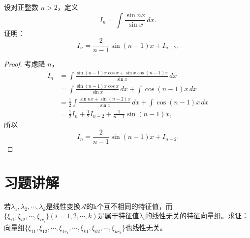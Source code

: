 \documentclass[lang=cn,12pt]{elegantbook}
\begin{document}
\begin{example}
    设对正整数 \( n > 2 \)，定义 
    \[
    I_n = \int \frac{\sin nx}{\sin x} \, dx.
    \]
    证明：
    \[
    I_n = \frac{2}{n-1} \sin(n-1)x + I_{n-2}.
    \]
    \end{example}
    
\begin{proof}
考虑降 \( n \)，
\[
\begin{aligned}
I_n &= \int \frac{\sin(n-1)x \cos x + \sin x \cos(n-1)x}{\sin x} \, dx \\
&= \int \frac{\sin(n-1)x \cos x}{\sin x} \, dx + \int \cos(n-1)x \, dx \\
&= \frac{1}{2} \int \frac{\sin nx + \sin(n-2)x}{\sin x} \, dx + \int \cos(n-1)x \, dx \\
&= \frac{1}{2} I_n + \frac{1}{2} I_{n-2} + \frac{1}{n-1} \sin(n-1)x,
\end{aligned}
\]
所以
\[
I_n = \frac{2}{n-1} \sin(n-1)x + I_{n-2}.
\]
\end{proof}

\section{习题讲解}

\begin{example}
    若$\lambda_1,\lambda_2,\cdots,\lambda_k$是线性变换$\mathcal{A}$的k个互不相同的特征值，而$\{\xi_{i1},\xi_{i2},\cdots,\xi_{ir_i}\} (i = 1 ,2,\cdots,k)$是属于特征值$\lambda_i$的线性无关的特征向量组。求证：向量组$\{\xi_{11},\xi_{12},\cdots,\xi_{1r_1},\cdots,\xi_{k1},\xi_{k2},\cdots,\xi_{kr_k}\}$也线性无关。
\end{example}
\end{document}
